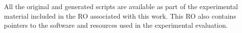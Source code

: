 All the original and generated scripts are available as part of the experimental material 
included in the RO associated with this work. This RO also contains pointers to the software and resources 
used in the experimental evaluation.


%
%
%
%

